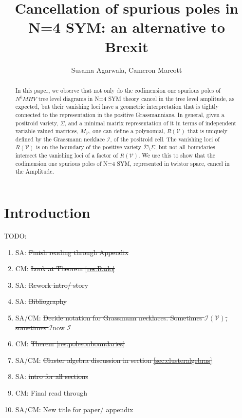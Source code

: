 \documentclass[11pt]{article}
\title{Cancellation of spurious poles in N=4 SYM: an alternative to Brexit}
\author{Susama Agarwala, Cameron Marcott}
\newcommand{\cV}{\mathcal{V}}
\newcommand{\cI}{\mathcal{I}}
\theoremstyle{remark}
\theoremstyle{definition}
\begin{document}
\maketitle
\begin{abstract}
In this paper, we observe that not only do the codimension one spurious poles of $N^kMHV$ tree level diagrams in N=4 SYM theory cancel in the tree level amplitude, as expected, but their vanishing loci have a geometric interpretation that is tightly connected to the representation in the positive Grassmannians. In general, given a positroid variety, $\Sigma$, and a minimal matrix representation of it in terms of independent variable valued matrices, $M_\cV$, one can define a polynomial, $R(\cV)$ that is uniquely defined by the Grassmann necklace $\cI$, of the positroid cell. The vanishing loci of $R(\cV)$ is on the boundary of the positive variety $\overline{\Sigma} \setminus \Sigma$, but not all boundaries intersect the vanishing loci of a factor of $R(\cV)$. We use this to show that the codimension one spurious poles of  N=4 SYM, represented in twistor space, cancel in the Amplitude.
\end{abstract}
\section{Introduction}

TODO:
\begin{enumerate}
\item SA: \st{Finish reading through Appendix}
\item CM: \st{Look at Theorem {\ref{res:Rado}}}
\item SA: \st{Rework intro/ story}
\item SA: \st{Bibliography}
\item SA/CM: \st{Decide notation for Grassmann necklaces. Sometimes $\cI(\cV)$, sometimes $\cI$}now $\cI$
\item CM: \st{Therem {\ref{res:polesonboundaries}}}
\item SA/CM: \st{Cluster algebra discussion in section {\ref{sec:clusteralgebras}}}
\item SA: \st{intro for all sections}
\item CM: Final read through
\item SA/CM: New title for paper/ appendix

\end{enumerate}
\end{document}
